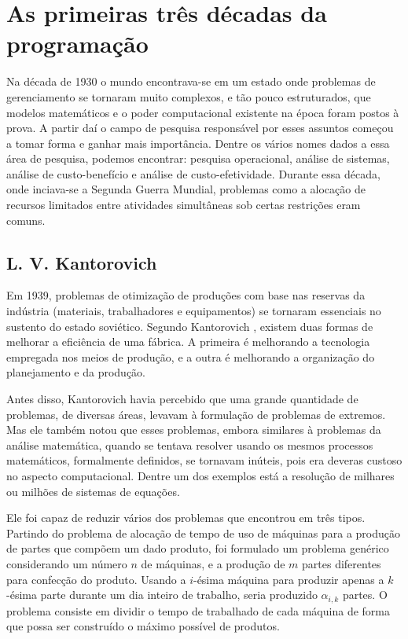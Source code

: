 
\section{As primeiras três décadas da programação}

Na década de 1930 o mundo encontrava-se em um estado onde problemas de gerenciamento
se tornaram muito complexos, e tão pouco estruturados, que modelos matemáticos e o poder
computacional existente na época foram postos à prova. A partir daí o campo de
pesquisa responsável por esses assuntos começou a tomar forma e ganhar mais importância.
Dentre os vários nomes dados a essa área de pesquisa, podemos encontrar: pesquisa operacional,
análise de sistemas, análise de custo-benefício e análise de custo-efetividade. Durante essa
década, onde inciava-se a Segunda Guerra Mundial, problemas como a alocação de recursos
limitados entre atividades simultâneas sob certas restrições eram comuns.


\subsection{L. V. Kantorovich}
\label{sec_kantorovich}

Em 1939, problemas de otimização de produções com base nas reservas da indústria (materiais,
trabalhadores e equipamentos) se tornaram essenciais no sustento do estado soviético.
Segundo Kantorovich \cite{kantorovich1939}, existem duas formas de melhorar a eficiência
de uma fábrica. A primeira é melhorando a tecnologia empregada nos meios de produção, e a
outra é melhorando a organização do planejamento e da produção.

Antes disso, Kantorovich havia percebido que uma grande quantidade de problemas, de diversas
áreas, levavam à formulação de problemas de extremos. Mas ele também notou que esses problemas,
embora similares à problemas da análise matemática, quando se tentava resolver
usando os mesmos processos matemáticos, formalmente definidos, se tornavam inúteis, pois era
deveras custoso no aspecto computacional. Dentre um dos exemplos está a resolução de milhares
ou milhões de sistemas de equações.

Ele foi capaz de reduzir vários dos problemas que encontrou em três tipos.
Partindo do problema de alocação de tempo de uso de máquinas para a produção de partes que compõem
um dado produto, foi formulado um problema genérico considerando um número
\(n\) de máquinas, e a produção de \(m\) partes diferentes para confecção do produto. Usando
a \(i\)-ésima máquina para produzir apenas a \(k\)-ésima parte durante um dia inteiro de trabalho,
seria produzido \(\alpha_{i, k}\) partes. O problema consiste em dividir o tempo de trabalhado de cada
máquina de forma que possa ser construído o máximo possível de produtos.


